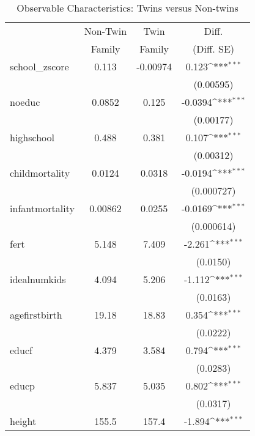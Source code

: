 \begin{table}[htbp]\centering
\def\sym#1{\ifmmode^{#1}\else\(^{#1}\)\fi}
\caption{Observable Characteristics: Twins versus Non-twins\label{tab1}}
\vspace{5mm}\begin{tabular}{l*{1}{ccc}}
\toprule\toprule & Non-Twin & Twin & Diff.\\
            &        Family&        Family&      (Diff. SE)         \\
\midrule
school\_zscore&       0.113&    -0.00974&       0.123\sym{***}\\
            &            &            &   (0.00595)         \\
noeduc      &      0.0852&       0.125&     -0.0394\sym{***}\\
            &            &            &   (0.00177)         \\
highschool  &       0.488&       0.381&       0.107\sym{***}\\
            &            &            &   (0.00312)         \\
childmortality&      0.0124&      0.0318&     -0.0194\sym{***}\\
            &            &            &  (0.000727)         \\
infantmortality&     0.00862&      0.0255&     -0.0169\sym{***}\\
            &            &            &  (0.000614)         \\
fert        &       5.148&       7.409&      -2.261\sym{***}\\
            &            &            &    (0.0150)         \\
idealnumkids&       4.094&       5.206&      -1.112\sym{***}\\
            &            &            &    (0.0163)         \\
agefirstbirth&       19.18&       18.83&       0.354\sym{***}\\
            &            &            &    (0.0222)         \\
educf       &       4.379&       3.584&       0.794\sym{***}\\
            &            &            &    (0.0283)         \\
educp       &       5.837&       5.035&       0.802\sym{***}\\
            &            &            &    (0.0317)         \\
height      &       155.5&       157.4&      -1.894\sym{***}\\

\end{tabular}
\end{table}

